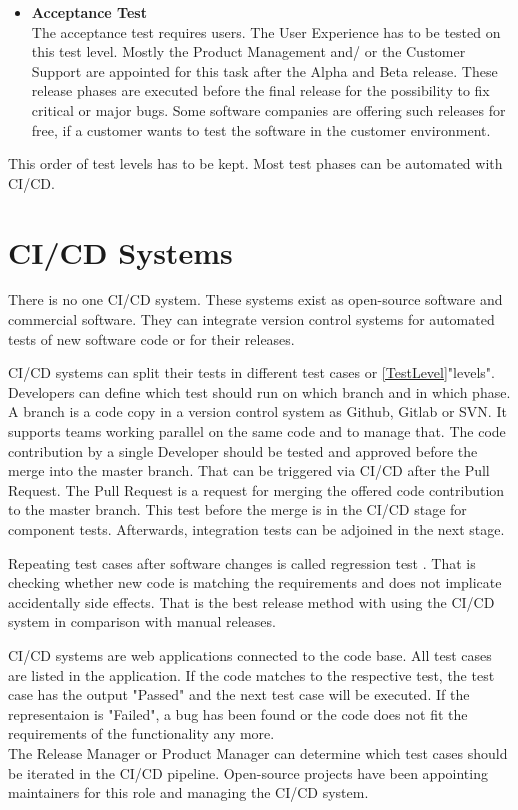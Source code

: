 \begin{itemize}
\item \textbf{Acceptance Test} \\
The acceptance test requires users. The User Experience has to be tested on this test level. Mostly the Product Management and/ or the Customer Support are appointed for this task after the Alpha and Beta release. These release phases are executed before the final release for the possibility to fix critical or major bugs.
Some software companies are offering such releases for free, if a customer wants to test the software in the customer environment.
\end{itemize}
This order of test levels has to be kept. Most test phases can be automated with CI/CD. 

\section{CI/CD Systems}

There is no one CI/CD system. These systems exist as open-source software and commercial software. They can integrate version control systems for automated tests of new software code or for their releases. 

CI/CD systems can split their tests in different test cases or \ref{TestLevel}"levels". Developers can define which test should run on which branch and in which phase. A branch is a code copy in a version control system as Github, Gitlab or SVN. It supports teams working parallel on the same code and to manage that. The code contribution by a single Developer should be tested and approved before the merge into the master branch. That can be triggered via CI/CD after the Pull Request. The Pull Request is a request for merging the offered code contribution to the master branch. This test before the merge is in the CI/CD stage for component tests. Afterwards, integration tests can be adjoined in the next stage.

Repeating test cases after software changes is called regression test \cite[~p.98]{Spillner2019}. That is checking whether new code is matching the requirements and does not implicate accidentally side effects. That is the best release method with using the CI/CD system in comparison with manual releases.

CI/CD systems are web applications connected to the code base. All test cases are listed in the application. If the code matches to the respective test, the test case has the output "Passed" and the next test case will be executed. If the representaion is "Failed", a bug has been found or the code does not fit the requirements of the functionality any more. \\
The Release Manager or Product Manager can determine which test cases should be iterated in the CI/CD pipeline. Open-source projects have been appointing maintainers for this role and managing the CI/CD system.


